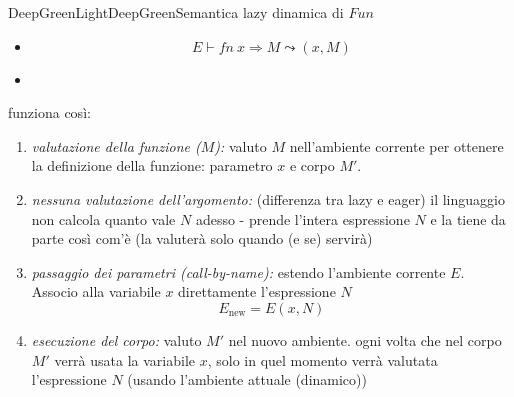 \documentclass[a4paper,11pt]{report}
\begin{document}
\begin{cdefframe}{DeepGreenLight}{DeepGreen}{Semantica lazy dinamica di \( Fun \)}{}
\begin{itemize}

\item{}
    \[ E \vdash fn \ x \Rightarrow M \leadsto (x, M) \]


    \item{}
    \begin{prooftree}
    \end{prooftree}
\end{itemize}

funziona così:
\begin{enumerate}
    \item \textit{valutazione della funzione (\(M\)):}
    valuto \( M \) nell'ambiente corrente per ottenere la definizione della funzione: parametro \( x \) e corpo \( M' \).

    \item \textit{nessuna valutazione dell'argomento:}
        (differenza tra lazy e eager) il linguaggio non calcola quanto vale \( N \) adesso - prende l'intera espressione \( N \) e la tiene da parte così com'è (la valuterà solo quando (e se) servirà)
    
    \item \textit{passaggio dei parametri (call-by-name):}
    estendo l'ambiente corrente \( E \).
    Associo alla variabile \( x \) direttamente l'espressione \( N \)
    \[ E_{\text{new}} = E (x, N)\]
    
\item \textit{esecuzione del corpo:}
    valuto \( M' \) nel nuovo ambiente. 
    \subitem ogni volta che nel corpo \( M' \) verrà usata la variabile \( x \), solo in quel momento verrà valutata l'espressione \( N \) {\color{gray}(usando l'ambiente attuale (dinamico))}
\end{enumerate}
\end{cdefframe}
\end{document}
